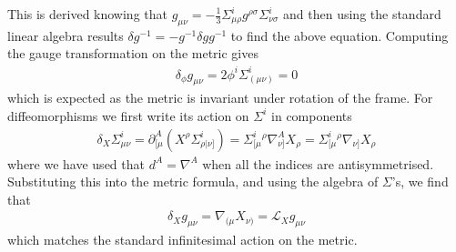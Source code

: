 \documentclass[10pt]{report}
\theoremstyle{definition}
\begin{document}
This is derived knowing that $g_{\mu\nu} = -\frac{1}{3}\Sigma^i_{\mu\rho} g^{\rho\sigma} \Sigma^i_{\nu\sigma}$ and then using the standard linear algebra results $\delta g^{-1} = - g^{-1} \delta g g^{-1}$ to find the above equation. Computing the gauge transformation on the metric gives 
\begin{align}
    \delta_\phi g_{\mu\nu} = 2 \phi^i \Sigma^i_{(\mu\nu)} = 0
\end{align}
which is expected as the metric is invariant under rotation of the frame. For diffeomorphisms we first write its action on $\Sigma^i$ in components 
\begin{align}
    \delta_X \Sigma^i_{\mu\nu} = \partial^A_{[\mu} \left( X^\rho \Sigma^i_{\rho|\nu]} \right) = \Sigma^i_{[\mu}{}^\rho \nabla^A_{\nu]} X_\rho = \Sigma^i_{[\mu}{}^\rho \nabla_{\nu]} X_\rho
\end{align}
where we have used that $d^A = \nabla^A$ when all the indices are antisymmetrised. Substituting this into the metric formula, and using the algebra of $\Sigma$'s, we find that 
\begin{align}
    \delta_X g_{\mu\nu} = \nabla_{(\mu} X_{\nu)} = \mathcal{L}_X g_{\mu\nu}
\end{align}
which matches the standard infinitesimal action on the metric.
\end{document}
